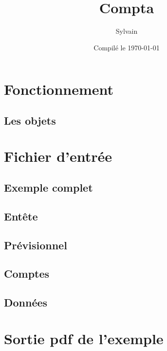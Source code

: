 \documentclass[a4paper,french]{report}
\begin{document}
\author{Sylvain}
\date{Compilé le \today}
\title{Compta \theversion}

\maketitle

\tableofcontents
\newpage



\chapter{Fonctionnement}
\label{chap:func}
\section{Les objets}

\label{sec:object}

\chapter{Fichier d'entrée}
\section{Exemple complet}


\section{Entête}


\section{Prévisionnel}


\section{Comptes}


\section{Données}


\appendix
\chapter{Sortie pdf de l'exemple}

\end{document}
